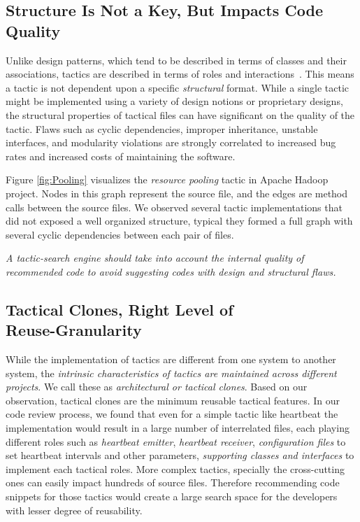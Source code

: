 \subsection{Structure Is Not a Key, But Impacts Code Quality}
Unlike design patterns, which tend to be described in terms of classes and their associations, tactics are described in terms of roles and interactions~\cite{bass:arch12}. This means a tactic is not dependent upon a specific {\em structural} format. While a single tactic might be implemented using a variety of design notions or proprietary designs, the structural properties of tactical files can have significant on the quality of the tactic. Flaws such as cyclic dependencies, improper inheritance, unstable interfaces, and modularity violations are strongly correlated to increased bug rates and increased costs of maintaining the software.

Figure \ref{fig:Pooling} visualizes the\textit{ resource pooling} tactic in Apache Hadoop project. Nodes in this graph represent the source file, and the edges are method calls between the source files. We observed several tactic implementations that did not exposed a well organized structure, typical they formed a full graph with several cyclic dependencies between each pair of files. 

\textit{A tactic-search engine should take into account the internal quality of recommended code to avoid suggesting codes with design and structural flaws.}


\subsection{Tactical Clones, Right Level of
\\Reuse-Granularity}
While the implementation of tactics are different from one system to another system, the \textit{intrinsic characteristics of tactics are maintained across different projects}. We call these as \emph{architectural or tactical clones}. Based on our observation, tactical clones are the minimum reusable tactical features.
In our code review process, we found that even for a simple tactic like heartbeat the implementation would result in a large number of interrelated files, each playing different roles such as \textit{heartbeat emitter}, \textit{heartbeat receiver}, \textit{configuration files} to set heartbeat intervals and other parameters,\textit{ supporting classes and interfaces} to implement each  tactical roles. More complex tactics, specially the cross-cutting ones can easily impact hundreds of source files. Therefore recommending code snippets for those tactics would create a large search space for the developers with lesser degree of reusability. 

